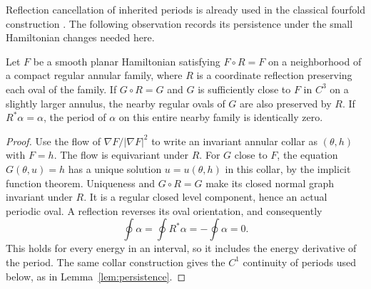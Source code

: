 Reflection cancellation of inherited periods is already used in the
classical fourfold construction \cite[equation~(3.3)]{ChristopherLloyd1995}.
The following observation records its persistence under the small
Hamiltonian changes needed here.

\begin{lemma}\label{lem:continued-symmetry}
Let $F$ be a smooth planar Hamiltonian satisfying $F\circ R=F$ on a
neighborhood of a compact regular annular family, where $R$ is a
coordinate reflection preserving each oval of the family.
If $G\circ R=G$ and $G$ is sufficiently close to $F$ in $C^3$ on a
slightly larger annulus, the nearby regular ovals of $G$ are also
preserved by $R$.  If $R^*\alpha=\alpha$, the period of $\alpha$ on
this entire nearby family is identically zero.
\end{lemma}

\begin{proof}
Use the flow of $\nabla F/|\nabla F|^2$ to write an invariant annular
collar as $(\theta,h)$ with $F=h$.  The flow is equivariant under $R$.
For $G$ close to $F$, the equation $G(\theta,u)=h$ has a unique solution
$u=u(\theta,h)$ in this collar, by the implicit function theorem.
Uniqueness and $G\circ R=G$ make its closed normal graph invariant under
$R$.  It is a regular closed level component, hence an actual periodic
oval.  A reflection reverses its oval orientation, and consequently
\[
 \oint\alpha=\oint R^*\alpha=-\oint\alpha=0.
\]
This holds for every energy in an interval, so it includes the energy
derivative of the period.  The same collar construction gives the
$C^1$ continuity of periods used below, as in
Lemma~\ref{lem:persistence}.
\end{proof}

